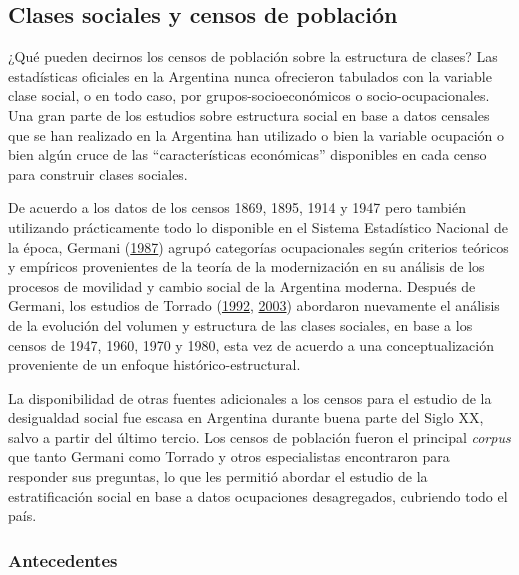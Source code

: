 \documentclass[
]{article}
\begin{document}
\hypertarget{clases3}{%
\subsection{Clases sociales y censos de población}\label{clases3}}

¿Qué pueden decirnos los censos de población sobre la estructura de clases? Las estadísticas oficiales en la Argentina nunca ofrecieron tabulados con la variable clase social, o en todo caso, por grupos-socioeconómicos o socio-ocupacionales. Una gran parte de los estudios sobre estructura social en base a datos censales que se han realizado en la Argentina han utilizado o bien la variable ocupación o bien algún cruce de las ``características económicas'' disponibles en cada censo para construir clases sociales.

De acuerdo a los datos de los censos 1869, 1895, 1914 y 1947 pero también utilizando prácticamente todo lo disponible en el Sistema Estadístico Nacional de la época, Germani (\protect\hyperlink{ref-Germani1987}{1987}) agrupó categorías ocupacionales según criterios teóricos y empíricos provenientes de la teoría de la modernización en su análisis de los procesos de movilidad y cambio social de la Argentina moderna. Después de Germani, los estudios de Torrado (\protect\hyperlink{ref-Torrado1992}{1992}, \protect\hyperlink{ref-Torrado2003a}{2003}) abordaron nuevamente el análisis de la evolución del volumen y estructura de las clases sociales, en base a los censos de 1947, 1960, 1970 y 1980, esta vez de acuerdo a una conceptualización proveniente de un enfoque histórico-estructural.

La disponibilidad de otras fuentes adicionales a los censos para el estudio de la desigualdad social fue escasa en Argentina durante buena parte del Siglo XX, salvo a partir del último tercio. Los censos de población fueron el principal \emph{corpus} que tanto Germani como Torrado y otros especialistas encontraron para responder sus preguntas, lo que les permitió abordar el estudio de la estratificación social en base a datos ocupaciones desagregados, cubriendo todo el país.

\hypertarget{antecedentes}{%
\subsubsection{Antecedentes}\label{antecedentes}}
\end{document}
